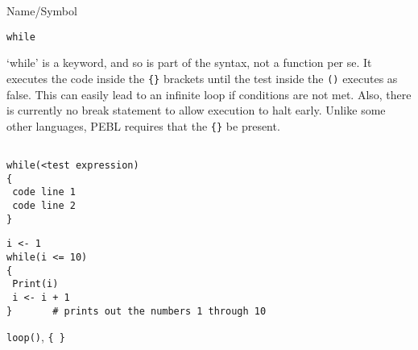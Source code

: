 \rl


\begin{desc}{Name/Symbol}
\item[Name/Symbol]	\verb+while+

\item[Description] `while' is a keyword, and so is part of the syntax,
  not a function per se.  It executes the code inside the \verb+{}+
  brackets until the test inside the \verb+()+ executes as false.
  This can easily lead to an infinite loop if conditions are not met.
  Also, there is currently no break statement to allow execution to
  halt early.  Unlike some other languages, PEBL requires that the
  \verb+{}+ be present.

\item[Usage]
\begin{verbatim}

while(<test expression)
{
 code line 1
 code line 2
}
\end{verbatim}

\item[Example] 
\begin{verbatim}
i <- 1
while(i <= 10)
{
 Print(i)
 i <- i + 1
}		# prints out the numbers 1 through 10
\end{verbatim}

\item[See Also] 	\verb+loop()+, \verb+{ }+


\end{desc}

\rl


